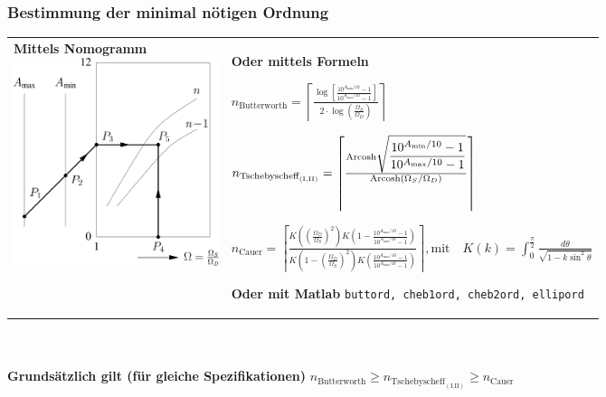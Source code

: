 \subsubsection{Bestimmung der minimal nötigen Ordnung}
\label{ordnung}
\begin{tabular}{p{7cm} p{11cm}}
\parbox{6cm}{
	\textbf{Mittels Nomogramm} \\
	\includegraphics[width=6cm]{./images/filter-nomogramme.png}
	}
& \parbox{12cm}{
	\textbf{Oder mittels Formeln}\\
    
  $n_{\text{Butterworth}} = \left\lceil\frac{\log{\left[\displaystyle\frac{10^{A_{\min}/10}-1}
  {10^{A_{\max}/10}-1}\right]}} {2 \cdot \log{\left(\frac{\Omega_{S}}{\Omega_{D}}\right)}}\right\rceil$
   \\ \\
    
  $n_{\text{Tschebyscheff}_{(\text{I,II})}} = \left\lceil\frac{{\rm Arcosh}
  \sqrt{\displaystyle\frac{10^{A_{\min}/10}-1}{10^{A_{\max}/10}-1}}}
  {{\rm Arcosh}\left({\Omega_{S}/\Omega_{D}}\right)} \right\rceil$
   \\ \\
    
  $n_{\text{Cauer}} = \left\lceil\frac{K\left(\left( \frac{\Omega_D}{\Omega_S}\right)^2\right)
  K\left(1-\frac{10^{A_{\max}/10}-1}{10^{A_{\min}/10}-1}\right) } {K\left(1-\left(\frac{\Omega_D}
  {\Omega_S}\right)^2\right )K\left(\frac{10^{A_{\max}/10}-1}{10^{A_{\min}/10}-1} \right)}\right\rceil,
  \text{mit}\quad
  K(k)=\int_0^{\frac{\pi}{2}}\frac{d\theta}{\sqrt{1-k\sin^2\theta}}$
  \\ \\

	\textbf{Oder mit Matlab}\\
	\texttt{buttord, cheb1ord, cheb2ord, ellipord}	
	}
\end{tabular} \\ \\
\textbf{Grundsätzlich gilt (für gleiche Spezifikationen)} \quad
$n_{\text{Butterworth}}\geq n_{\text{Tschebyscheff}_{(\text{I,II})}}\geq n_{\text{Cauer}}$


